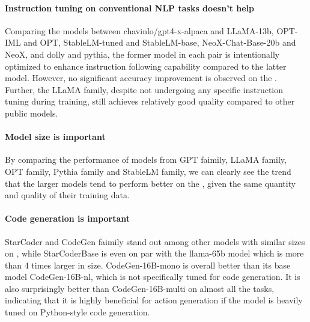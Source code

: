 \paragraph{Instruction tuning on conventional NLP tasks doesn't help}
Comparing the models between chavinlo/gpt4-x-alpaca and LLaMA-13b, OPT-IML and OPT, StableLM-tuned and StableLM-base, NeoX-Chat-Base-20b and NeoX, and dolly and pythia, the former model in each pair is intentionally optimized to enhance instruction following capability compared to the latter model. However, no significant accuracy improvement is observed on the \snact. 
Further, the LLaMA family, despite not undergoing any specific instruction tuning during training, still achieves relatively good quality compared to other public models.  

\paragraph{Model size is important} By comparing the performance of models from GPT faimily, LLaMA family, OPT family, Pythia family and StableLM family, we can clearly see the trend that the larger models tend to perform better on the \snact, given the same quantity and quality of their training data. 

\paragraph{Code generation is important} StarCoder and CodeGen faimily stand out among other models with similar sizes on \snact, while StarCoderBase is even on par with the llama-65b model which is more than 4 times larger in size. CodeGen-16B-mono is overall better than its base model CodeGen-16B-nl, which is not specifically tuned for code generation. It is also surprisingly better than CodeGen-16B-multi on almost all the tasks, indicating that it is highly beneficial for action generation if the model is heavily tuned on Python-style code generation. 







